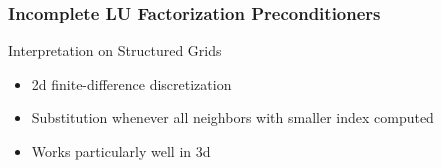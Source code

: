 \begin{frame}[fragile]
\frametitle{Incomplete LU Factorization Preconditioners}

     \begin{block}{Interpretation on Structured Grids}
      \begin{itemize}
        \item 2d finite-difference discretization
        \item Substitution whenever all neighbors with smaller index computed
        \item Works particularly well in 3d
      \end{itemize}

      \begin{center}

\end{center}
\end{block}
\end{frame}
